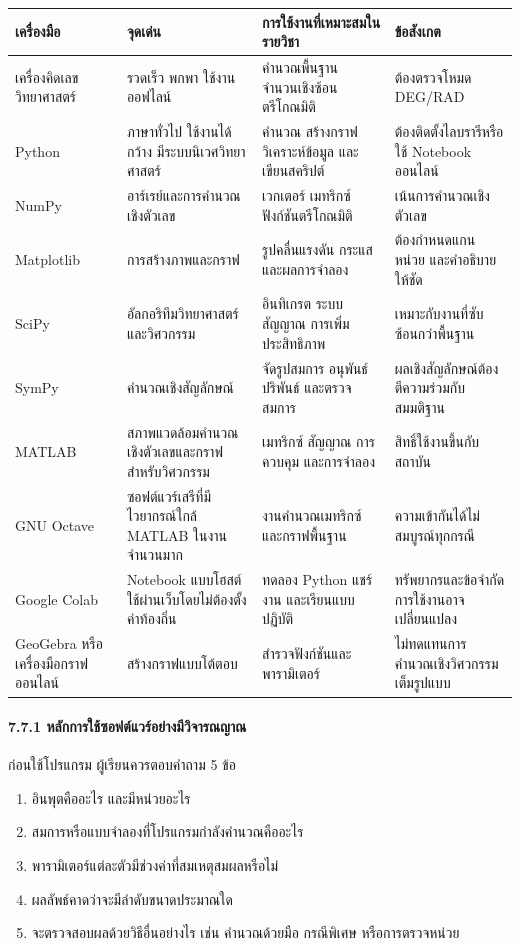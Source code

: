 \begin{table}[htbp]
    \centering
    \begin{tabular}{l l l l}
        \hline
        \textbf{เครื่องมือ} & \textbf{จุดเด่น} & \textbf{การใช้งานที่เหมาะสมในรายวิชา} & \textbf{ข้อสังเกต} \\
        \hline
        เครื่องคิดเลขวิทยาศาสตร์ & รวดเร็ว พกพา ใช้งานออฟไลน์ & คำนวณพื้นฐาน จำนวนเชิงซ้อน ตรีโกณมิติ & ต้องตรวจโหมด DEG/RAD \\
        Python & ภาษาทั่วไป ใช้งานได้กว้าง มีระบบนิเวศวิทยาศาสตร์ & คำนวณ สร้างกราฟ วิเคราะห์ข้อมูล และเขียนสคริปต์ & ต้องติดตั้งไลบรารีหรือใช้ Notebook ออนไลน์ \\
        NumPy & อาร์เรย์และการคำนวณเชิงตัวเลข & เวกเตอร์ เมทริกซ์ ฟังก์ชันตรีโกณมิติ & เน้นการคำนวณเชิงตัวเลข \\
        Matplotlib & การสร้างภาพและกราฟ & รูปคลื่นแรงดัน กระแส และผลการจำลอง & ต้องกำหนดแกน หน่วย และคำอธิบายให้ชัด \\
        SciPy & อัลกอริทึมวิทยาศาสตร์และวิศวกรรม & อินทิเกรต ระบบสัญญาณ การเพิ่มประสิทธิภาพ & เหมาะกับงานที่ซับซ้อนกว่าพื้นฐาน \\
        SymPy & คำนวณเชิงสัญลักษณ์ & จัดรูปสมการ อนุพันธ์ ปริพันธ์ และตรวจสมการ & ผลเชิงสัญลักษณ์ต้องตีความร่วมกับสมมติฐาน \\
        MATLAB & สภาพแวดล้อมคำนวณเชิงตัวเลขและกราฟสำหรับวิศวกรรม & เมทริกซ์ สัญญาณ การควบคุม และการจำลอง & สิทธิ์ใช้งานขึ้นกับสถาบัน \\
        GNU Octave & ซอฟต์แวร์เสรีที่มีไวยากรณ์ใกล้ MATLAB ในงานจำนวนมาก & งานคำนวณเมทริกซ์และกราฟพื้นฐาน & ความเข้ากันได้ไม่สมบูรณ์ทุกกรณี \\
        Google Colab & Notebook แบบโฮสต์ ใช้ผ่านเว็บโดยไม่ต้องตั้งค่าท้องถิ่น & ทดลอง Python แชร์งาน และเรียนแบบปฏิบัติ & ทรัพยากรและข้อจำกัดการใช้งานอาจเปลี่ยนแปลง \\
        GeoGebra หรือเครื่องมือกราฟออนไลน์ & สร้างกราฟแบบโต้ตอบ & สำรวจฟังก์ชันและพารามิเตอร์ & ไม่ทดแทนการคำนวณเชิงวิศวกรรมเต็มรูปแบบ \\
        \hline
    \end{tabular}
\end{table}

\paragraph{7.7.1 หลักการใช้ซอฟต์แวร์อย่างมีวิจารณญาณ}

ก่อนใช้โปรแกรม ผู้เรียนควรตอบคำถาม 5 ข้อ

\begin{enumerate}
    \item อินพุตคืออะไร และมีหน่วยอะไร
    \item สมการหรือแบบจำลองที่โปรแกรมกำลังคำนวณคืออะไร
    \item พารามิเตอร์แต่ละตัวมีช่วงค่าที่สมเหตุสมผลหรือไม่
    \item ผลลัพธ์คาดว่าจะมีลำดับขนาดประมาณใด
    \item จะตรวจสอบผลด้วยวิธีอื่นอย่างไร เช่น คำนวณด้วยมือ กรณีพิเศษ หรือการตรวจหน่วย
\end{enumerate}

